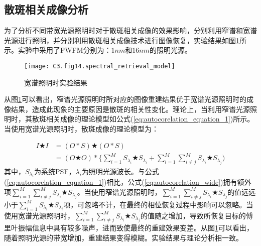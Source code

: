 \subsection{散斑相关成像分析}
为了分析不同带宽光源照明时对于散斑相关成像的效果影响，分别利用窄谱和宽谱光源进行照明，并分别利用散斑相关成像技术进行图像恢复，实验结果如图\ref{fig:3.13}所示。实验中采用了FWFM分别为：$1nm$和$16nm$的照明光源。
\begin{figure}[htp]
	\centering
	\texttt{[image: C3.fig14.spectral\_retrieval\_model]}
	\caption{宽谱照明时实验结果}
	\label{fig:3.13}
\end{figure}
从图\ref{fig:3.13}可以看出，窄谱光源照明时所对应的图像重建结果优于宽谱光源照明时的成像结果，造成此现象的主要原因是散斑的相关性变化。理论上，当利用窄谱光源照明时，其散斑相关成像的理论模型如公式(\ref{eq:autocorelation_equation_1})所示。当使用宽谱光源照明时，散斑成像的理论模型为：

\begin{equation}
\begin{aligned}
    I \bigstar I  &= (O*S) \bigstar (O*S) \\
		              &=  (O \bigstar O)*\{\sum_{i=1}^{M} S_{\lambda_i} \bigstar S_{\lambda_i}+ \sum_{i=1}^{M}\sum_{i \ne j}^{M} S_{\lambda_i} \bigstar S_{\lambda_j})
\end{aligned}
\label{eq:autocorelation_wide}
\end{equation}
其中，$S_{\lambda_i}$为系统PSF，$\lambda_i$为照明光源波长。与公式(\ref{eq:autocorelation_equation_1})相比，公式(\ref{eq:autocorelation_wide})拥有额外项$\sum_{i=1}^{M}\sum_{i \ne j}^{M} S_{\lambda_i} \bigstar S_{\lambda_j}$。当使用窄谱光源照明时，$\sum_{i=1}^{M}\sum_{i \ne j}^{M} S_{\lambda_i} \bigstar S_{\lambda_j}$的值远远小于$\sum_{i=1}^{M} S_{\lambda_i} \bigstar S_{\lambda_i}$项，可忽略不计，在最终的相位恢复过程中影响可以忽略。当使用宽谱光源照明时，$\sum_{i=1}^{M}\sum_{i \ne j}^{M} S_{\lambda_i} \bigstar S_{\lambda_j}$的值随之增加，导致所恢复目标的傅里叶振幅信息中具有较多噪声，进而致使最终的重建效果变差。从图\ref{fig:3.13}可以看出，随着照明光源的带宽增加，重建结果变得模糊。实验结果与理论分析相一致。
